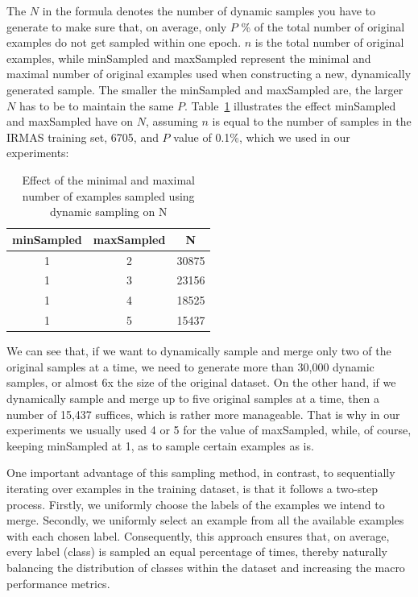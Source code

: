 \DynamicSamplingNoSamples

The $N$ in the formula denotes the number of dynamic samples you have to generate to make sure that, on average, only $P$ \% of the total number of original examples do not get sampled within one epoch. $n$ is the total number of original examples, while minSampled and maxSampled represent the minimal and maximal number of original examples used when constructing a new, dynamically generated sample. The smaller the minSampled and maxSampled are, the larger $N$ has to be to maintain the same $P$. Table~\ref{tab:num-dynamic-samples} illustrates the effect  minSampled and maxSampled have on $N$, assuming $n$ is equal to the number of samples in the IRMAS training set, 6705, and $P$ value of 0.1\%, which we used in our experiments: 

\begin{table}[H]
\centering
\begin{tabular}{ccc}
\hline
minSampled & maxSampled & N     \\ \hline
1          & 2          & 30875 \\
1          & 3          & 23156 \\
1          & 4          & 18525 \\
1          & 5          & 15437
\end{tabular}
\caption{Effect of the minimal and maximal number of examples sampled using dynamic sampling on N}
\label{tab:num-dynamic-samples}
\end{table}

We can see that, if we want to dynamically sample and merge only two of the original samples at a time, we need to generate more than 30,000 dynamic samples, or almost 6x the size of the original dataset. On the other hand, if we dynamically sample and merge up to five original samples at a time, then a number of 15,437 suffices, which is rather more manageable. That is why in our experiments we usually used 4 or 5 for the value of maxSampled, while, of course, keeping minSampled at 1, as to sample certain examples as is.

One important advantage of this sampling method, in contrast, to sequentially iterating over examples in the training dataset, is that it follows a two-step process. Firstly, we uniformly choose the labels of the examples we intend to merge. Secondly, we uniformly select an example from all the available examples with each chosen label. Consequently, this approach ensures that, on average, every label (class) is sampled an equal percentage of times, thereby naturally balancing the distribution of classes within the dataset and increasing the macro performance metrics.


